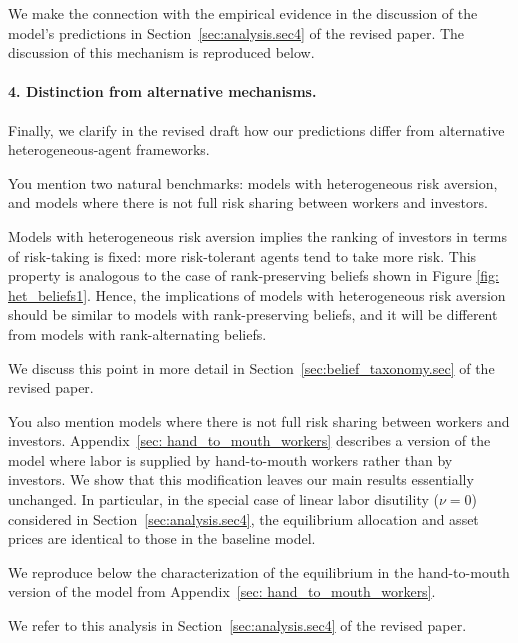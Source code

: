 \documentclass[12pt,a4paper]{article}
\newcommand{\changesbox}[1]{
	\noindent\vspace{-8pt}
\begin{mdframed}[style=manuscript] 
	#1
\end{mdframed}}
\begin{document}
    We make the connection with the empirical evidence in the discussion of the model's predictions in Section~\ref{sec:analysis.sec4} of the revised paper. 
    The discussion of this mechanism is reproduced below.

    \changesbox{
    }

\paragraph{4. Distinction from alternative mechanisms.}

Finally, we clarify in the revised draft how our predictions differ from alternative
heterogeneous-agent frameworks.

You mention two natural benchmarks: models with heterogeneous risk aversion, and models where there is not full risk sharing between workers and investors.

Models with heterogeneous risk aversion implies the ranking of investors in terms of risk-taking is fixed: more risk-tolerant agents tend to take more risk.
This property is analogous to the case of rank-preserving beliefs shown in Figure \ref{fig: het_beliefs1}.
Hence, the implications of models with heterogeneous risk aversion should be similar to models with rank-preserving beliefs, and it will be different from models with rank-alternating beliefs.

We discuss this point in more detail in Section~\ref{sec:belief_taxonomy.sec} of the revised paper.

\changesbox{
}

You also mention models where there is not full risk sharing between workers and investors.
Appendix~\ref{sec: hand_to_mouth_workers} describes a version of the model where labor is supplied by hand-to-mouth workers rather than by investors.
We show that this modification leaves our main results essentially unchanged.
In particular, in the special case of linear labor disutility ($\nu = 0$) considered in Section~\ref{sec:analysis.sec4}, the equilibrium allocation and asset prices are identical to those in the baseline model.

We reproduce below the characterization of the equilibrium in the hand-to-mouth version of the model from Appendix~\ref{sec: hand_to_mouth_workers}.
\changesbox{
}

We refer to this analysis in Section~\ref{sec:analysis.sec4} of the revised paper.
\changesbox{
}
\end{document}
